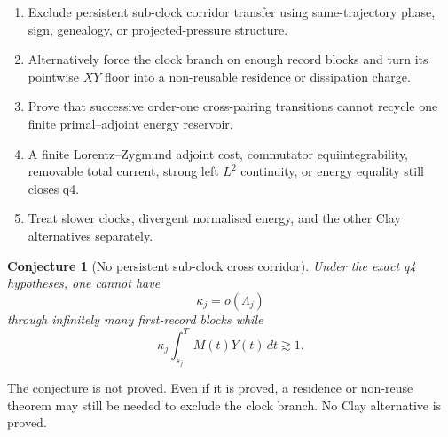 \documentclass[11pt]{article}
\newtheorem{conjecture}[theorem]{Conjecture}
\theoremstyle{remark}
\begin{document}
\begin{enumerate}
\item Exclude persistent sub-clock corridor transfer using
same-trajectory phase, sign, genealogy, or projected-pressure structure.
\item Alternatively force the clock branch on enough record blocks and
turn its pointwise \(XY\) floor into a non-reusable residence or
dissipation charge.
\item Prove that successive order-one cross-pairing transitions cannot
recycle one finite primal--adjoint energy reservoir.
\item A finite Lorentz--Zygmund adjoint cost, commutator
equiintegrability, removable total current, strong left \(L^2\)
continuity, or energy equality still closes q4.
\item Treat slower clocks, divergent normalised energy, and the other
Clay alternatives separately.
\end{enumerate}

\begin{conjecture}[No persistent sub-clock cross corridor]
Under the exact q4 hypotheses, one cannot have
\[
 \kappa_j=o(\Lambda_j)
\]
through infinitely many first-record blocks while
\[
 \kappa_j
 \int_{s_j}^TM(t)Y(t)\,dt
 \gtrsim1.
\]
\end{conjecture}

The conjecture is not proved.  Even if it is proved, a residence or
non-reuse theorem may still be needed to exclude the clock branch.  No
Clay alternative is proved.
\end{document}
